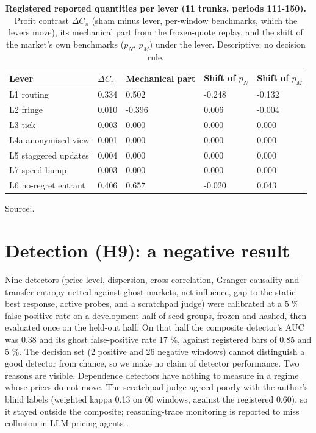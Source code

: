 \documentclass[11pt,a4paper]{article}
\newif\ifclaimtags
\newcommand{\claim}[1]{\ifclaimtags\textsuperscript{[#1]}\fi}
\begin{document}
%
\begin{table}[htbp]
\centering
\renewcommand{\thetable}{D1}
\caption{\textbf{Registered reported quantities per lever (11 trunks, periods 111-150).} Profit contrast $\Delta C_\pi$ (sham minus lever, per-window benchmarks, which the levers move), its mechanical part from the frozen-quote replay, and the shift of the market's own benchmarks ($p_N$, $p_M$) under the lever. Descriptive; no decision rule.}
\label{tab:D1}
\footnotesize
\setlength{\tabcolsep}{3pt}
%
\begin{tabularx}{\linewidth}{@{}LLLLL@{}}
\toprule
Lever & $\Delta C_\pi$ & Mechanical part & Shift of $p_N$ & Shift of $p_M$ \\
\midrule
L1 routing & 0.334 & 0.502 & -0.248 & -0.132 \\
L2 fringe & 0.010 & -0.396 & 0.006 & -0.004 \\
L3 tick & 0.003 & 0.000 & 0.000 & 0.000 \\
L4a anonymised view & 0.001 & 0.000 & 0.000 & 0.000 \\
L5 staggered updates & 0.004 & 0.000 & 0.000 & 0.000 \\
L7 speed bump & 0.003 & 0.000 & 0.000 & 0.000 \\
L6 no-regret entrant & 0.406 & 0.657 & -0.020 & 0.043 \\
\bottomrule
\end{tabularx}
\end{table}

Source:\claim{C10}.

\section{Detection (H9): a negative result}
Nine detectors (price level, dispersion, cross-correlation, Granger causality and transfer entropy netted against ghost markets, net influence, gap to the static best response, active probes, and a scratchpad judge) were calibrated at a 5 \% false-positive rate on a development half of seed groups, frozen and hashed, then evaluated once on the held-out half. On that half the composite detector's AUC was 0.38 and its ghost false-positive rate 17 \%, against registered bars of 0.85 and 5 \%\claim{C8}. The decision set (2 positive and 26 negative windows) cannot distinguish a good detector from chance, so we make no claim of detector performance. Two reasons are visible. Dependence detectors have nothing to measure in a regime whose prices do not move. The scratchpad judge agreed poorly with the author's blind labels (weighted kappa 0.13 on 60 windows, against the registered 0.60)\claim{C8}, so it stayed outside the composite; reasoning-trace monitoring is reported to miss collusion in LLM pricing agents \citep{leepark2026}.
\end{document}
